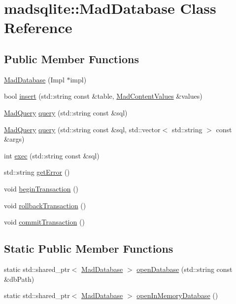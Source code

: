 \hypertarget{classmadsqlite_1_1_mad_database}{}\section{madsqlite\+:\+:Mad\+Database Class Reference}
\label{classmadsqlite_1_1_mad_database}
\subsection*{Public Member Functions}
\begin{DoxyCompactItemize}
\item 
\hyperlink{classmadsqlite_1_1_mad_database_adeaa573aff2327d76018be2db2ecf638}{Mad\+Database} (Impl $\ast$impl)
\item 
bool \hyperlink{classmadsqlite_1_1_mad_database_a9383a29a4411d29a5345cd233e32756d}{insert} (std\+::string const \&table, \hyperlink{classmadsqlite_1_1_mad_content_values}{Mad\+Content\+Values} \&values)
\item 
\hyperlink{classmadsqlite_1_1_mad_query}{Mad\+Query} \hyperlink{classmadsqlite_1_1_mad_database_a6fb119ea383a9d93b7d3a5ddce7bc756}{query} (std\+::string const \&sql)
\item 
\hyperlink{classmadsqlite_1_1_mad_query}{Mad\+Query} \hyperlink{classmadsqlite_1_1_mad_database_a6514212d65ca428fb35ee87b9d3c78af}{query} (std\+::string const \&sql, std\+::vector$<$ std\+::string $>$ const \&args)
\item 
int \hyperlink{classmadsqlite_1_1_mad_database_adba4c69666317dcdf14cd3a1eb6260dd}{exec} (std\+::string const \&sql)
\item 
std\+::string \hyperlink{classmadsqlite_1_1_mad_database_ad70e43249370cd4a04183f3f98751b4e}{get\+Error} ()
\item 
void \hyperlink{classmadsqlite_1_1_mad_database_a985f7430489959d345b01ffc191a70d5}{begin\+Transaction} ()
\item 
void \hyperlink{classmadsqlite_1_1_mad_database_a3ebfd4349bde98e99dace3875c964861}{rollback\+Transaction} ()
\item 
void \hyperlink{classmadsqlite_1_1_mad_database_a438b3c7393a84de57b638db06d84bd7b}{commit\+Transaction} ()
\end{DoxyCompactItemize}
\subsection*{Static Public Member Functions}
\begin{DoxyCompactItemize}
\item 
static std\+::shared\+\_\+ptr$<$ \hyperlink{classmadsqlite_1_1_mad_database}{Mad\+Database} $>$ \hyperlink{classmadsqlite_1_1_mad_database_a68c5b61e4cf000f4947f9c43a2c12338}{open\+Database} (std\+::string const \&db\+Path)
\item 
static std\+::shared\+\_\+ptr$<$ \hyperlink{classmadsqlite_1_1_mad_database}{Mad\+Database} $>$ \hyperlink{classmadsqlite_1_1_mad_database_ac38e0559a2d724541d8ac7102db4fcd1}{open\+In\+Memory\+Database} ()
\end{DoxyCompactItemize}


